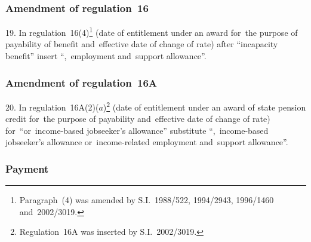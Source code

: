 \documentclass[12pt,a4paper]{article}
\begin{document}
\subsubsection[19. Amendment of regulation~16]{Amendment of regulation~16}

19.  In regulation~16(4)\footnote{Paragraph~(4) was amended by S.I.~1988/522, 1994/2943, 1996/1460 and~2002/3019.} (date of entitlement under an award for~the purpose of payability of benefit and~effective date of change of rate) after “incapacity benefit” insert “,~employment and~support allowance”.

\subsubsection[20. Amendment of regulation~16A]{Amendment of regulation~16A}

20.  In regulation~16A(2)($a$)\footnote{Regulation~16A was inserted by S.I.~2002/3019.} (date of entitlement under an award of state pension credit for~the purpose of payability and~effective date of change of rate) for~“or~income-based jobseeker’s allowance” substitute “,~income-based jobseeker’s allowance or~income-related employment and~support allowance”.

\subsubsection[21. Payment]{Payment}
\end{document}
